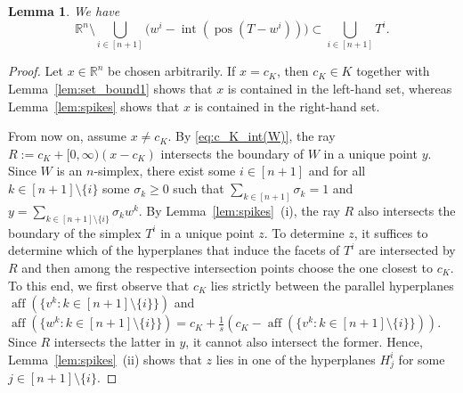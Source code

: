 \documentclass{amsart}
\newtheorem{lemma}[theorem]{Lemma}
\newcommand\R{\mathbb{R}}
\DeclareMathOperator{\pos}{pos}
\DeclareMathOperator{\aff}{aff}
\DeclareMathOperator{\inte}{int}
\begin{document}
\begin{lemma}\label{lem:set_bound2}
We have
\[
	\R^n \setminus \bigcup_{i \in [n+1]} \big( w^i - \inte(\pos( T - w^i )) \big)
	\subset \bigcup_{i \in [n+1]} T^i.
\]
\end{lemma}
\begin{proof}
Let $x \in \R^n$ be chosen arbitrarily.
If $x = c_K$, then $c_K \in K$ together with Lemma~\ref{lem:set_bound1} shows that $x$ is contained in the left-hand set,
whereas Lemma~\ref{lem:spikes} shows that $x$ is contained in the right-hand set.

From now on, assume $x \neq c_K$.
By \eqref{eq:c_K_int(W)},
the ray $R := c_K + [0,\infty) (x - c_K)$ intersects the boundary of $W$ in a unique point $y$.
Since $W$ is an $n$-simplex, there exist some $i \in [n+1]$ and for all $k \in [n+1] \setminus \{i\}$ some $\sigma_k \geq 0$
such that $\sum_{k \in [n+1]} \sigma_k = 1$ and $y = \sum_{k \in [n+1] \setminus \{i\}} \sigma_k w^k$.
By Lemma~\ref{lem:spikes}~(i),
the ray $R$ also intersects the boundary of the simplex $T^i$ in a unique point $z$.
To determine $z$,
it suffices to determine which of the hyperplanes that induce the facets of $T^i$ are intersected by $R$
and then among the respective intersection points choose the one closest to $c_K$.
To this end, we first observe that $c_K$ lies strictly between the parallel hyperplanes $\aff(\{ v^k : k \in [n+1] \setminus \{i\} \})$
and $\aff(\{ w^k : k \in [n+1] \setminus \{i\} \}) = c_K + \frac{1}{s} (c_K - \aff(\{ v^k : k \in [n+1] \setminus \{i\} \}))$.
Since $R$ intersects the latter in $y$, it cannot also intersect the former.
Hence, Lemma~\ref{lem:spikes}~(ii) shows that $z$ lies in one of the hyperplanes $H^i_j$ for some $j \in [n+1] \setminus \{i\}$.


\end{proof}
\end{document}
